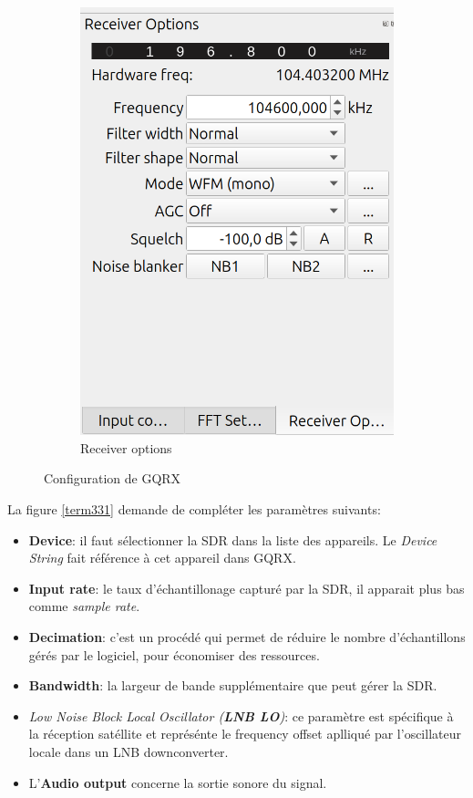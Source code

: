 \begin{figure}[h]
\begin{subfigure}{0.4\textwidth}
  \includegraphics[width=\textwidth]{images/gqrx3.png}
  \caption{Receiver options}
  \label{term341}
\end{subfigure}
\caption{Configuration de GQRX}
\label{term37}
\end{figure}

La figure \ref{term331} demande de compléter les paramètres suivants:

\vspace{0.1cm}

\begin{itemize}
\item \textbf{Device}: il faut sélectionner la SDR dans la liste des appareils. Le \textit{Device String} fait référence à cet appareil dans GQRX.
\item \textbf{Input rate}: le taux d'échantillonage capturé par la SDR, il apparait plus bas comme \textit{sample rate}.
\item \textbf{Decimation}: c'est un procédé qui permet de réduire le nombre d'échan\-tillons gérés par le logiciel, pour économiser des ressources.
\item \textbf{Bandwidth}: la largeur de bande supplémentaire que peut gérer la SDR.
\item \textit{Low Noise Block Local Oscillator (\textbf{LNB LO})}: ce paramètre est spécifique à la réception satéllite et représénte le frequency offset aplliqué par l'oscillateur locale dans un LNB downconverter.
\item L'\textbf{Audio output} concerne la sortie sonore du signal.
\end{itemize}

